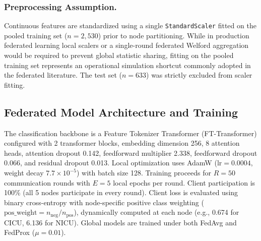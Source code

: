 \documentclass[runningheads]{llncs}
\begin{document}
\subsubsection{Preprocessing Assumption.} Continuous features are standardized using a single \texttt{StandardScaler} fitted on the pooled training set ($n = 2{,}530$) prior to node partitioning. While in production federated learning local scalers or a single-round federated Welford aggregation would be required to prevent global statistic sharing, fitting on the pooled training set represents an operational simulation shortcut commonly adopted in the federated literature. The test set ($n = 633$) was strictly excluded from scaler fitting.

\subsection{Federated Model Architecture and Training}
The classification backbone is a Feature Tokenizer Transformer (FT-Transformer) \cite{gorishniy2021revisiting} configured with 2 transformer blocks, embedding dimension 256, 8 attention heads, attention dropout 0.142, feedforward multiplier 2.338, feedforward dropout 0.066, and residual dropout 0.013. Local optimization uses AdamW ($\text{lr} = 0.0004$, weight decay $7.7\times 10^{-5}$) with batch size 128. Training proceeds for $R = 50$ communication rounds with $E = 5$ local epochs per round. Client participation is 100\% (all 5 nodes participate in every round). Client loss is evaluated using binary cross-entropy with node-specific positive class weighting ($\text{pos\_weight} = n_{\text{neg}} / n_{\text{pos}}$), dynamically computed at each node (e.g., 0.674 for CICU, 6.136 for NICU). Global models are trained under both FedAvg and FedProx ($\mu = 0.01$).
\end{document}
